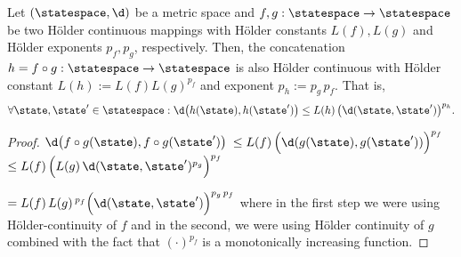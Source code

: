 %
%


\begin{thm} \label{thm:hoelderconcat}
Let $(\statespace, \d)$ be a metric space and $f,g : \statespace \to \statespace$ be two H\"older continuous mappings with H\"older constants $L(f), L(g)$ and H\"older exponents $p_f,p_g$, respectively.
Then, the concatenation $h=f \circ g: \statespace \to \statespace $ is also H\"older continuous with H\"older constant $L(h):= L(f) L(g)^{p_f}$ and exponent $p_h:=p_g \, p_f$.
That is, 
\[\forall \state,\state' \in \statespace: \d\bigl(h(\state),h(\state')\bigr) \leq L(h) \, \bigl(\d(\state,\state')\bigr)^{p_h}.\]
\begin{proof}
$\d\bigl(f \circ g(\state),f\circ g(\state')\bigr)$ $\leq L(f)\,  \Bigl(\d(g(\state),g(\state'))\Bigr)^{p_f}$
$\leq L(f)\,  \Bigl(L(g)\, \d(\state,\state')^{p_g}\Bigr)^{p_f}$ 

$= L(f)\, L(g)\,^{p_f}   \Bigl(\d(\state,\state')\Bigr)^{p_g\, p_f} $ where in the first step we were using H\"older-continuity of $f$ and in the second, we were using H\"older continuity of $g$ combined with the fact that $(\cdot)^{p_f}$ is a monotonically increasing  function. 
\end{proof}
\end{thm} 







